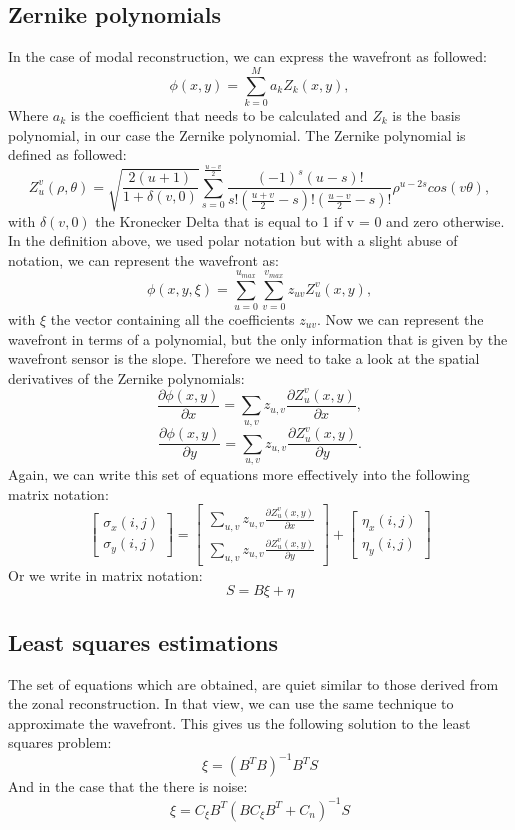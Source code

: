 \documentclass{article}
\begin{document}
\subsection{Zernike polynomials}
In the case of modal reconstruction, we can express the wavefront as followed:
$$
\phi (x,y) = \sum_{k=0}^{M}a_kZ_k(x,y), 
$$
Where $a_k$ is the coefficient that needs to be calculated and $Z_k$ is the basis polynomial, in our case the Zernike polynomial. The Zernike polynomial is defined as followed:
$$
Z_u^v(\rho,\theta) = \sqrt{\frac{2(u+1)}{1+\delta(v,0)}}\sum_{s=0}^{\frac{u-v}{2}}\frac{(-1)^s(u-s)!}{s!(\frac{u+v}{2}-s)!(\frac{u-v}{2}-s)!}
\rho^{u-2s}cos(v\theta),
$$
with $\delta(v,0)$ the Kronecker Delta that is equal to 1 if v = 0 and zero otherwise. In the definition above, we used polar notation but with a slight abuse of notation, we can represent the wavefront as:
$$
\phi (x,y,\xi) = \sum_{u=0}^{u_{max}}\sum_{v=0}^{v_{max}}z_{uv}Z_u^v(x,y),
$$
with $\xi$ the vector containing all the coefficients $z_{uv}$.
Now we can represent the wavefront in terms of a polynomial, but the only information that is given by the wavefront sensor is the slope. Therefore we need to take a look at the spatial derivatives of the Zernike polynomials:
$$
\frac{\partial \phi(x,y)}{\partial x} = \sum_{u,v}z_{u,v}\frac{\partial Z_u^v(x,y)}{\partial x},
$$
$$
\frac{\partial \phi(x,y)}{\partial y} = \sum_{u,v}z_{u,v}\frac{\partial Z_u^v(x,y)}{\partial y}.
$$
Again, we can write this set of equations more effectively into the following matrix notation:
$$
\begin{bmatrix}
\sigma_x(i,j) \\
\sigma_y(i,j)
\end{bmatrix}
=
\begin{bmatrix}
\sum_{u,v}z_{u,v}\frac{\partial Z_u^v(x,y)}{\partial x} \\
\sum_{u,v}z_{u,v}\frac{\partial Z_u^v(x,y)}{\partial y}
\end{bmatrix}
+
\begin{bmatrix}
\eta_x(i,j) \\
\eta_y(i,j)
\end{bmatrix}
$$
Or we write in matrix notation:
$$
S = B\xi + \eta
$$
\subsection{Least squares estimations}
The set of equations which are obtained, are quiet similar to those derived from the zonal reconstruction. In that view, we can use the same technique to approximate the wavefront. This gives us the following solution to the least squares problem:
$$
\hat{\xi} = (B^TB)^{-1}B^TS 
$$
And in the case that the there is noise:
$$
\hat{\xi} = C_\xi B^T(BC_\xi B^T + C_n)^{-1}S
$$
\end{document}
